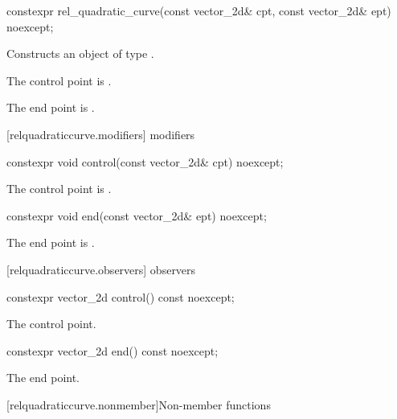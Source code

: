 %
\begin{itemdecl}
constexpr rel_quadratic_curve(const vector_2d& cpt, const vector_2d& ept)
  noexcept;
\end{itemdecl}
\begin{itemdescr}
\pnum
\effects
Constructs an object of type .

\pnum
The control point is .

\pnum
The end point is .
\end{itemdescr}

 [relquadraticcurve.modifiers]{ modifiers}%

%
\begin{itemdecl}
constexpr void control(const vector_2d& cpt) noexcept;
\end{itemdecl}
\begin{itemdescr}
\pnum
\effects
The control point is .
\end{itemdescr}

%
\begin{itemdecl}
constexpr void end(const vector_2d& ept) noexcept;
\end{itemdecl}
\begin{itemdescr}
\pnum
\effects
The end point is .
\end{itemdescr}

 [relquadraticcurve.observers]{ observers}%

%
\begin{itemdecl}
constexpr vector_2d control() const noexcept;
\end{itemdecl}
\begin{itemdescr}
\pnum
\returns
The control point.
\end{itemdescr}

%
\begin{itemdecl}
constexpr vector_2d end() const noexcept;
\end{itemdecl}
\begin{itemdescr}
\pnum
\returns
The end point.
\end{itemdescr}

 [relquadraticcurve.nonmember]{Non-member functions}%


